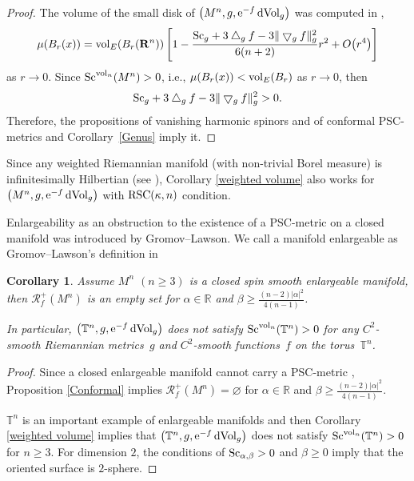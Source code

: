 \documentclass[10pt,a4paper]{amsart}
\newtheorem{Corollary}[Theorem]{Corollary}
\begin{document}
\begin{proof}The volume of the small disk of $\big(M^n, g, {\rm e}^{-f}\,{\rm dVol}_g\big)$ was computed in \cite[Theorem~8]{MR1458581},
\begin{align*}
\mu(B_r(x)) = {\rm vol}_E(B_r(\mathbf{R}^n))\left[1 - \frac{{\rm Sc}_g +3 \bigtriangleup_gf -3\| \bigtriangledown_gf\|^2_g }{6(n+2)} r^2 + O\big(r^4\big)\right]
 \end{align*}
as $r \rightarrow 0$. Since ${\rm Sc}^{{\rm vol}_n}(M^n) > 0$, i.e., $ \mu(B_r(x)) < {\rm vol}_E(B_r)$ as $r \rightarrow 0$, then
\begin{align*}
 {\rm Sc}_g +3 \bigtriangleup_gf -3\|\bigtriangledown_gf\|^2_g > 0.
\end{align*}
 Therefore, the propositions of vanishing harmonic spinors and of conformal PSC-metrics and Corollary~\ref{Genus} imply it.
\end{proof}

\begin{Remark}
Since any weighted Riemannian manifold (with non-trivial Borel measure) is infinitesimally Hilbertian (see \cite{MR4059811}), Corollary \ref{weighted volume} also works for $\big(M^n, g, {\rm e}^{-f}\,{\rm dVol}_g\big)$ with ${\rm RSC}(\kappa, n)$ condition.
\end{Remark}

Enlargeability as an obstruction to the existence of a PSC-metric on a closed manifold was introduced by Gromov--Lawson. We call a manifold enlargeable as Gromov--Lawson's definition in \cite[Definition~5.5]{MR720933}

\begin{Corollary}
Assume $M^n$ $(n\geq 3)$ is a closed spin smooth enlargeable manifold, then $\mathcal{R}^+_f(M^n)$ is an empty set for $\alpha \in \mathbb{R}$ and $\beta \geq \frac{(n-2)|\alpha|^2}{4(n-1)}$.

 In particular, $\big(\mathbb{T}^n,g, {\rm e}^{-f}\,{\rm dVol}_g\big)$ does not satisfy ${\rm Sc}^{{\rm vol}_n}(\mathbb{T}^n) >0$ for any $C^2$-smooth Riemannian metrics~$g$ and $C^2$-smooth functions~$f$ on the torus~$\mathbb{T}^n$.
\end{Corollary}

\begin{proof}Since a closed enlargeable manifold cannot carry a PSC-metric \cite[Theorem~5.8]{MR720933}, Proposition \ref{Conformal} implies $\mathcal{R}^+_f(M^n)=\varnothing$ for $\alpha \in \mathbb{R}$ and $\beta \geq \frac{(n-2)|\alpha|^2}{4(n-1)}$.

 $\mathbb{T}^n$ is an important example of enlargeable manifolds and then Corollary \ref{weighted volume} implies that $\big(\mathbb{T}^n,g, {\rm e}^{-f}\,{\rm dVol}_g\big)$ does not satisfy ${\rm Sc}^{{\rm vol}_n}(\mathbb{T}^n) >0$ for $n\geq 3$. For dimension $2$, the conditions of ${\rm Sc}_{\alpha, \beta} > 0$ and $\beta\geq 0$ imply that the oriented surface is $2$-sphere.
\end{proof}
\end{document}
